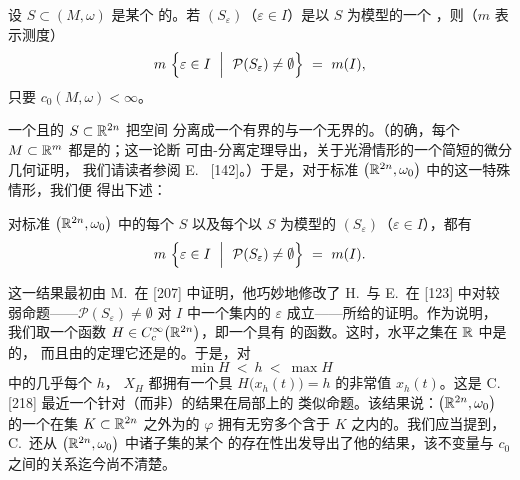 \begin{theorem}\label{thm:almost-every-level}
设\trHypersurface{} $S\subset(M,\omega)$ 是某个\trCompact\trSymplecticManifold{}%
的\trBoundary。若 $(S_{\varepsilon})$（$\varepsilon\in I$）是以 $S$ 为模型的一个%
\trParameterizedHypersurfaceFamily{}，则（$m$ 表示\trLebesgue{}测度）
\[
m\ \Bigl\{\varepsilon\in I\ \Bigm|\ \mathcal{P}(S_{\varepsilon})\neq\emptyset%
\Bigr\}\ =\ m(I),
\]
只要 $c_{0}(M,\omega)<\infty$。
\end{theorem}

一个\trCompact{}且\trConnected{}的\trHypersurface{} $S\subset\mathbb{R}^{2n}$ 把空间%
分离成一个有界的与一个无界的\trConnectedComponent。（的确，每个%
\trCompact\trSmooth\trHypersurface{} $M\subset\mathbb{R}^{m}$ 都是\trOrientable{}的；这一论断%
可由\trJordan-\trBrouwer{}分离定理导出，关于光滑情形的一个简短的微分几何证明，%
我们请读者参阅 E.~\trLima{} [142]。）于是，对于标准\trSymplecticManifold{}%
$\bigl(\mathbb{R}^{2n},\omega_{0}\bigr)$ 中的\trHypersurface{}这一特殊情形，我们便%
得出下述\trhCorollary：

\begin{corollary}\label{cor:standard-almost-all}
对标准\trSymplecticManifold{} $\bigl(\mathbb{R}^{2n},\omega_{0}\bigr)$ 中的每个%
\trCompact\trHypersurface{} $S$ 以及每个以 $S$ 为模型的\trParameterizedHypersurfaceFamily{}%
$(S_{\varepsilon})$（$\varepsilon\in I$），都有
\[
m\ \Bigl\{\varepsilon\in I\ \Bigm|\ \mathcal{P}(S_{\varepsilon})\neq\emptyset%
\Bigr\}\ =\ m(I).
\]
\end{corollary}

这一结果最初由 M.~\trStruwe{}在 [207] 中证明，他巧妙地修改了 H.~\trHofer{}与%
E.~\trZehnder{}在 [123] 中对较弱命题——$\mathcal{P}(S_{\varepsilon})\neq\emptyset$%
对 $I$ 中一个\trDense{}集内的 $\varepsilon$ 成立——所给的证明。作为说明，%
我们取一个\trSmooth{}函数 $H\in C^{\infty}_{c}\bigl(\mathbb{R}^{2n}\bigr)$，即一个具有%
\trCompactSupport{}的函数。这时，\trCritical{}水平之集在 $\mathbb{R}$ 中是\trCompact{}的，%
而且由\trSard{}的\trMeasureZero{}定理它还是\trMeasureZero{}的。于是，对
\[
\min H\ <\ h\ <\ \max H
\]
中的几乎每个 $h$，\trHamiltonianVectorField{} $X_{H}$ 都拥有一个具\trEnergy{}%
$H\bigl(x_{h}(t)\bigr)=h$ 的非常值\trPeriodicSolution{} $x_{h}(t)$。这是%
C.~\trViterbo{} [218] 最近一个针对\trMapping（而非\trVectorField）的结果在局部上的%
类似命题。该结果说：$\bigl(\mathbb{R}^{2n},\omega_{0}\bigr)$ 的一个在\trCompact{}集%
$K\subset\mathbb{R}^{2n}$ 之外为\trIdentityMap{}的\trSymplecticDiffeomorphism{}%
$\varphi$ 拥有无穷多个含于 $K$ 之内的\trPeriodicOrbit。我们应当提到，%
C.~\trViterbo{}还从 $\bigl(\mathbb{R}^{2n},\omega_{0}\bigr)$ 中诸子集的某个%
\trSymplecticInvariant{}的存在性出发导出了他的结果，该不变量与\trCapacity{}%
$c_{0}$ 之间的关系迄今尚不清楚。
